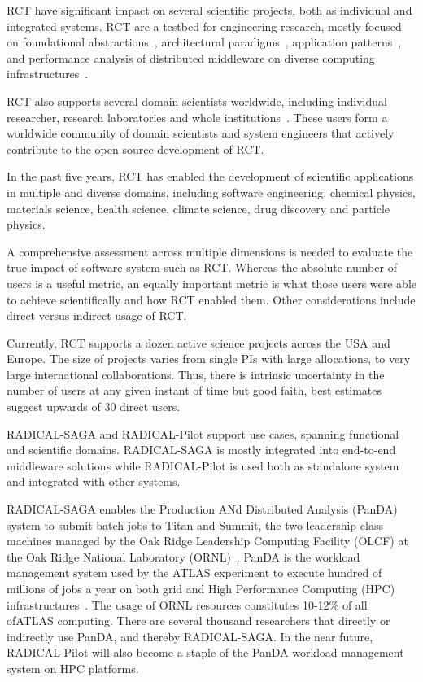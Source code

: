 \documentclass[preprint,12pt, a4paper]{elsarticle}
\begin{document}
RCT have significant impact on several scientific projects, both as individual
and integrated systems. RCT are a testbed for engineering research, mostly
focused on foundational abstractions~\cite{}, architectural paradigms~\cite{},
application patterns~\cite{}, and performance analysis of distributed
middleware on diverse computing infrastructures~\cite{}. 

RCT also supports several domain scientists worldwide, including individual
researcher, research laboratories and whole institutions~\cite{}. These users
form a worldwide community of domain scientists and system engineers that
actively contribute to the open source development of RCT.

In the past five years, RCT has enabled the development of scientific
applications in multiple and diverse domains, including software engineering,
chemical physics, materials science, health science, climate science, drug
discovery and particle physics. 


A comprehensive assessment across multiple dimensions is needed to evaluate
the true impact of software system such as RCT. Whereas the absolute number of
users is a useful metric, an equally important metric is what those users were
able to achieve scientifically and how RCT enabled them. Other considerations
include direct versus indirect usage of RCT. 

Currently, RCT supports a dozen active science projects across the USA and
Europe. The size of projects varies from single PIs with large allocations, to
very large international collaborations. Thus, there is intrinsic uncertainty
in the number of users at any given instant of time but good faith, best
estimates suggest upwards of 30 direct users.


RADICAL-SAGA and RADICAL-Pilot support use cases, spanning functional and
scientific domains. RADICAL-SAGA is mostly integrated into end-to-end
middleware solutions while RADICAL-Pilot is used both as standalone system and
integrated with other systems.

RADICAL-SAGA enables the Production ANd Distributed Analysis (PanDA) system to
submit batch jobs to Titan and Summit, the two leadership class machines
managed by the Oak Ridge Leadership Computing Facility (OLCF) at the Oak Ridge
National Laboratory (ORNL)~\cite{}. PanDA is the workload management system
used by the ATLAS experiment to execute hundred of millions of jobs a year on
both grid and High Performance Computing (HPC) infrastructures~\cite{}. The
usage of ORNL resources constitutes 10-12\% of all  ofATLAS computing. There
are several thousand researchers that directly or indirectly use PanDA, and
thereby RADICAL-SAGA. In the near future, RADICAL-Pilot will also become a
staple of the PanDA workload management system on HPC platforms.
\end{document}
